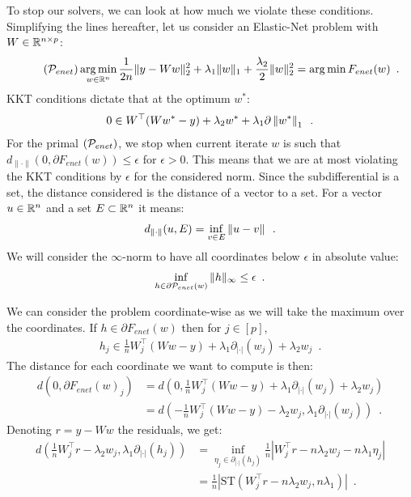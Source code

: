 \documentclass[../main.tex]{subfiles}
\begin{document}
To stop our solvers, we can look at how much we violate these conditions.
Simplifying the lines hereafter, let us consider an Elastic-Net problem
with $W\in\mathbb{R}^{n\times p}$:
\begin{align}\tag{$\mathcal{P}_{enet}$}
	\argmin_{w\in\bbR^n}
	\frac{1}{2n} \|y - Ww\|^2_2 + \lambda_1 \|w\|_1 +
	\frac{\lambda_2}{2}\|w\|^2_2 = \argmin F_{enet}(w)
	\enspace.
\end{align}
KKT conditions dictate that at the optimum $w^*$:
\begin{align*}
	0 \in W^\top (Ww^* - y) + \lambda_2 w^* + \lambda_1 \partial\left \lVert w^* \right \rVert_1
	\enspace.
\end{align*}
For the primal $(\mathcal{P}_{enet})$, we stop when current iterate $w$ is such that
$d_{\|\cdot\|}(0, \partial F_{enet}(w))\leq \epsilon$ for $\epsilon > 0$.
This means that we are at most violating the KKT conditions by $\epsilon$ for the
considered norm.
Since the subdifferential is a set, the distance considered is the distance of
a vector to a set.
For a vector $u\in\mathbb{R}^n$ and a set $E\subset \mathbb{R}^n$ it means:
\begin{align*}
	d_{\left \lVert \cdot \right \rVert}(u, E) = \inf_{v\in E}\left \lVert u-v \right \rVert\enspace.
\end{align*}
We will consider the $\infty$-norm to have all coordinates below $\epsilon$
in absolute value:
\begin{align}\label{eq:eps_kkt}
	\inf_{h\in \partial\mathcal{P}_{enet}(w)} \|h\|_\infty\leq\epsilon\enspace.
\end{align}

We can consider the problem coordinate-wise as we will take the maximum over
the coordinates.
If $h\in\partial F_{enet}(w)$ then for $j\in [p]$,
\begin{align*}
	h_j \in \frac{1}{n} W_j^\top (W w - y) +
	\lambda_1 \partial_{|\cdot |}(w_j) + \lambda_2 w_j
	\enspace.
\end{align*}
The distance for each coordinate we want to compute is then:
\begin{align*}
	d(0, \partial F_{enet}(w)_j)
	&=
		d\left(0, \frac{1}{n}W_j^\top (Ww-y) +
		 \lambda_1\partial_{|\cdot |}(w_j)+\lambda_2w_j\right) \\
	&=
		d\left(-\frac{1}{n}W_j^\top(Ww-y) - \lambda_2w_j,
		\lambda_1\partial_{|\cdot |}(w_j)\right)\enspace.
\end{align*}
Denoting $r=y - Ww$ the residuals, we get:
\begin{align}
		d\left(\frac{1}{n} W_j^\top r - \lambda_2 w_j,
			\lambda_1\partial_{|\cdot|}(h_j) \right)
			&= \inf_{\eta_j \in \partial_{|\cdot|}(h_j)}
			\frac{1}{n} \left| W_j^\top r-n \lambda_2 w_j
				- n \lambda_1 \eta_j\right|
				\nonumber\\
			&= \frac{1}{n} \left| \mathrm{ST}\left( W_j^\top r - n \lambda_2 w_j
				,n\lambda_1 \right) \right| \enspace.  \label{eq:stop_coord}
\end{align}
\end{document}
